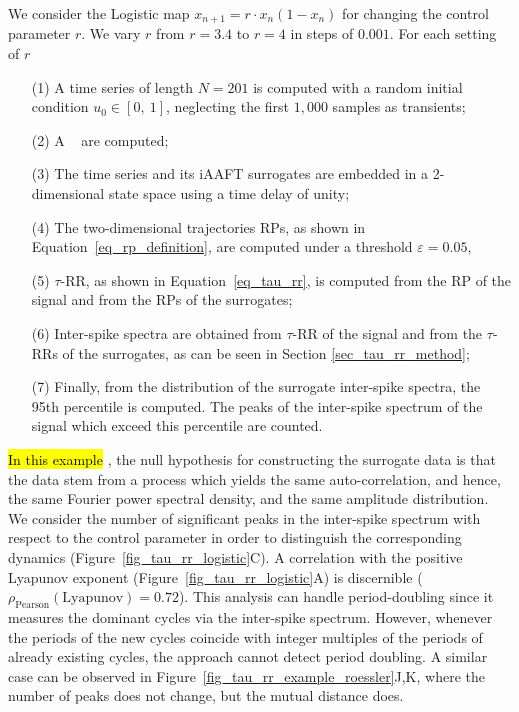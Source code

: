 \documentclass[entropy,article,accept,pdftex,moreauthors]{Definitions/mdpi}
\begin{document}
We consider the Logistic map $x_{n+1}=r\cdot x_n \left( 1-x_n \right)$ for changing the control parameter $r$. We vary $r$ from $r=3.4$ to $r=4$ in steps of $0.001$. For 
each setting of $r$ 
\begin{itemize}[noitemsep]
\item[(1)] A time series of length $N=201$ is computed with a random initial condition \mbox{$u_0 \in [0,\ 1]$}, neglecting the first $1,000$ samples as transients;
\item[(2)] A ~\cite{Schreiber1996,Schreiber2000} are computed;
\item[(3)] The time series and its iAAFT surrogates are embedded in a 2-dimensional state space using a time delay of unity;
\item[(4)] The two-dimensional trajectories RPs, as shown in Equation~\eqref{eq_rp_definition}, are computed under a threshold $\varepsilon=0.05$,
\item[(5)] $\tau$-RR, as shown in Equation~\eqref{eq_tau_rr}, is computed from the RP of the signal and from the RPs of the surrogates;
\item[(6)] Inter-spike spectra are obtained from $\tau$-RR of the signal and from the $\tau$-RRs of the surrogates, as can be seen in Section \ref{sec_tau_rr_method};
\item[(7)] Finally, from the distribution of the surrogate inter-spike spectra, the 95th percentile is computed. The peaks of the inter-spike spectrum of the signal which exceed 
this percentile are counted. 
\end{itemize}

\hl{In this example} %
, the null hypothesis for constructing the surrogate data is that the data stem from a process which yields the same auto-correlation, and
hence, the same Fourier power spectral density, and the same 
amplitude distribution. We consider the number of significant peaks in the inter-spike spectrum with
respect to the control parameter in order to distinguish the corresponding dynamics (Figure~\ref{fig_tau_rr_logistic}C).
A correlation with the positive Lyapunov exponent (Figure~\ref{fig_tau_rr_logistic}A) is discernible 
($\rho_{\text{Pearson}}(\text{Lyapunov})=0.72$). This analysis can handle period-doubling since it measures the dominant cycles via the inter-spike spectrum. 
However, whenever the periods of the new cycles coincide with integer multiples of the periods of already existing cycles, the approach cannot detect 
period doubling. A similar case can be observed in Figure~\ref{fig_tau_rr_example_roessler}J,K, where the number of peaks does not change, but  the mutual distance does. 
\end{document}
